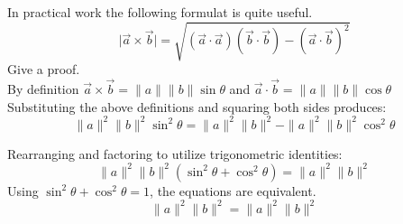 In practical work the following formulat is quite useful. 
\begin{equation}
	\vert\vec{a} \times \vec{b} \vert= \sqrt{\left(\vec{a}\cdot\vec{a}\right) \left(\vec{b}\cdot\vec{b}\right)-\left(\vec{a}\cdot\vec{b}\right)^2}
	\end{equation}
Give a proof.\\ 

By definition $\vec{a} \times \vec{b}=\|a\|\|b\|\sin \theta$ and $\vec{a}\cdot\vec{b}=\|a\|\|b\|\cos\theta$
Substituting the above definitions and squaring both sides produces:
\begin{equation*}
	\|a\|^2\|b\|^2\sin^2 \theta=\|a\|^2\|b\|^2-\|a\|^2\|b\|^2\cos^2\theta
\end{equation*}

Rearranging and factoring to utilize trigonometric identities:
\begin{equation*}
	\|a\|^2\|b\|^2\left(\sin^2 \theta+\cos^2\theta\right)=\|a\|^2\|b\|^2
\end{equation*}
Using $\sin^2 \theta+\cos^2\theta=1$, the equations are equivalent.
\begin{equation*}
	\|a\|^2\|b\|^2=\|a\|^2\|b\|^2
\end{equation*}